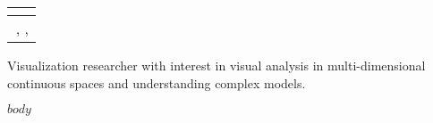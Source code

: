 \documentclass[11pt]{article}
\author{Thomas Torsney-Weir}
\makeatletter
\newcommand*{\theauthor}{}
\newcommand*{\theemail}{}
\newcommand*{\thephone}{}
\newcommand*{\theaddress}{}
\newlength{\mytitlewidth}
\renewcommand*{\maketitle}{%
  \begin{tabular*}{\mytitlewidth}{@{}l@{\extracolsep{\fill}}r@{\extracolsep{0ex}~}}
  \textbf{\large{\theauthor}} &  \\ \hline
  \multicolumn{2}{r}{\theaddress, \thephone, \theemail}
  \end{tabular*}
}
\makeatother
\begin{document}
%
%

\maketitle


Visualization researcher with interest in visual analysis in 
multi-dimensional continuous spaces and understanding complex models.

$body$
\end{document}
